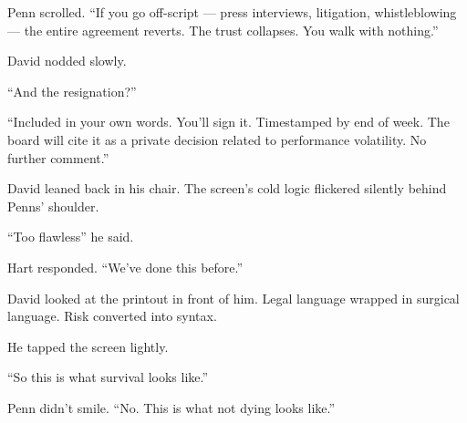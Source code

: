 Penn scrolled. ``If you go off-script — press interviews, litigation, whistleblowing — the entire 
agreement reverts. The trust collapses. You walk with nothing.''

David nodded slowly.

``And the resignation?''

``Included in your own words. You’ll sign it. Timestamped by end of week. The board will cite it as a 
private decision related to performance volatility. No further comment.''

David leaned back in his chair. The screen’s cold logic flickered silently behind Penns’ shoulder. 

``Too flawless'' he said.

Hart responded.  
``We’ve done this before.''

David looked at the printout in front of him. Legal language wrapped in surgical language. Risk 
converted into syntax.

He tapped the screen lightly.

``So this is what survival looks like.''

Penn didn’t smile. ``No. This is what not dying looks like.''

